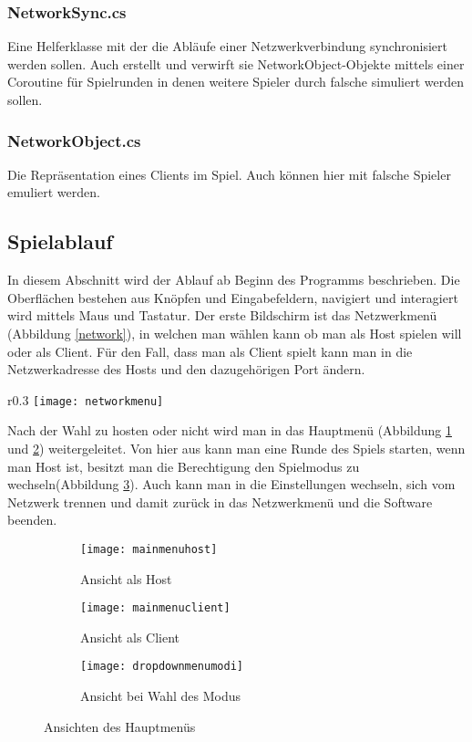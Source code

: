 \subsubsection{NetworkSync.cs}
Eine Helferklasse mit der die Abläufe einer Netzwerkverbindung synchronisiert werden sollen.
Auch  erstellt und  verwirft sie NetworkObject-Objekte mittels einer Coroutine für Spielrunden in denen weitere Spieler durch falsche simuliert werden sollen.
\subsubsection{NetworkObject.cs}
Die Repräsentation eines Clients im Spiel. Auch können hier mit falsche Spieler emuliert werden.

\subsection{Spielablauf}
In diesem Abschnitt wird der Ablauf ab Beginn des Programms beschrieben. Die Oberflächen bestehen aus Knöpfen und Eingabefeldern, navigiert und interagiert wird mittels Maus und Tastatur. Der erste Bildschirm ist das Netzwerkmenü (Abbildung \ref{network}), in welchen man wählen kann ob man als Host spielen will oder als Client. Für den Fall, dass man als Client spielt kann man in die Netzwerkadresse des Hosts und den dazugehörigen Port ändern.
\begin{wrapfigure}{r}{0.3\textwidth}
	\centering
	\texttt{[image: networkmenu]}
    \caption{Netwerkmenü}
   \label{network}
\end{wrapfigure}
Nach der Wahl zu hosten oder nicht wird man in das Hauptmenü (Abbildung \ref{fig:menuhost} und \ref{fig:menuclient}) weitergeleitet. Von hier aus kann man eine Runde des Spiels starten, wenn man Host ist, besitzt man die Berechtigung den Spielmodus zu wechseln(Abbildung \ref{fig:menumodi}). Auch kann man in die Einstellungen wechseln, sich vom Netzwerk trennen und damit zurück in das Netzwerkmenü und die Software beenden.\newline
\begin{figure}[b]
	\centering
    \begin{subfigure}[a]{0.3\linewidth}
    	\texttt{[image: mainmenuhost]}
    	\caption{Ansicht als Host}
        \label{fig:menuhost}
    \end{subfigure}
    \begin{subfigure}[a]{0.3\linewidth}
    	\texttt{[image: mainmenuclient]}
    	\caption{Ansicht als Client}
        \label{fig:menuclient}
    \end{subfigure}
    \begin{subfigure}[a]{0.3\linewidth}
    	\texttt{[image: dropdownmenumodi]}
    	\caption{Ansicht bei Wahl des Modus}
        \label{fig:menumodi}
    \end{subfigure}
    \caption{Ansichten des Hauptmenüs}
    \label{menu}
\end{figure}
